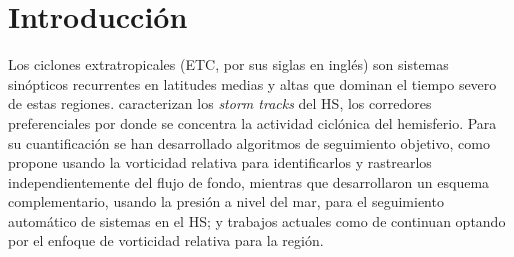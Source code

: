 \chapter{Introducción} \label{ch:introduccion}


Los ciclones extratropicales (ETC, por sus siglas en inglés) son sistemas sinópticos recurrentes en latitudes medias y altas que dominan el tiempo severo de estas regiones.
\citet{hoskins2005new} caracterizan los \textit{storm tracks} del HS, los corredores preferenciales por donde se concentra la actividad ciclónica del hemisferio.
Para su cuantificación se han desarrollado algoritmos de seguimiento objetivo, como propone \citet{sinclair1994objective} usando la vorticidad relativa para identificarlos y rastrearlos independientemente del flujo de fondo, mientras que \citet{simmonds1999southern} desarrollaron un esquema complementario, usando la presión a nivel del mar, para el seguimiento automático de sistemas en el HS; y trabajos actuales como de \citet{padilhareinke2024objective} continuan optando por el enfoque de vorticidad relativa para la región.

